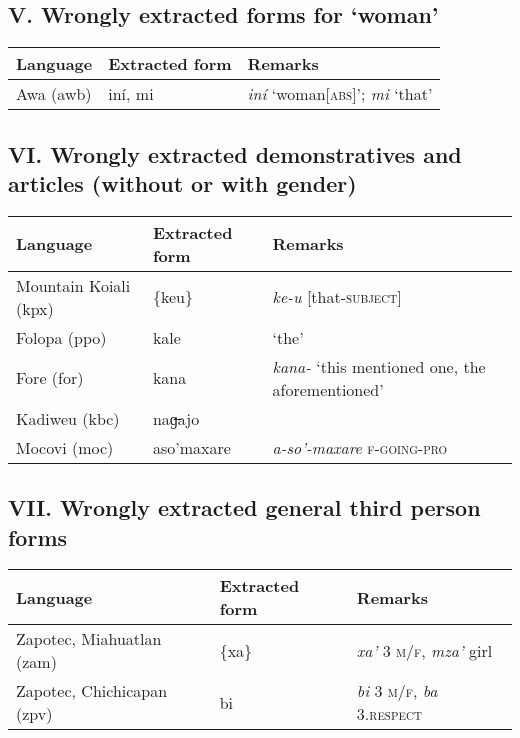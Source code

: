 \subsection*{V. Wrongly extracted forms for ‘woman’ \normalfont [1 language]}

{%
\setlength\tabcolsep{1.5pt}
\small
\begin{tabular}{L{.25\textwidth}L{.25\textwidth}L{.5\textwidth}}
\toprule
\bfseries Language & \bfseries Extracted form & \bfseries Remarks \\
\midrule
Awa (awb)	 & {iní, mi}	 & \textit{iní} ‘woman[\textsc{abs}]’; \textit{mi} ‘that’\\
\bottomrule
\end{tabular}
}%


\subsection*{VI. Wrongly extracted demonstratives and articles (without or with gender)
\normalfont [5 languages]}

{%
\setlength\tabcolsep{1.5pt}
\small
\begin{tabular}{L{.25\textwidth}L{.25\textwidth}L{.5\textwidth}}
\toprule
\bfseries Language & \bfseries Extracted form & \bfseries Remarks \\
\midrule
Mountain Koiali (kpx)	&	\{keu\}	&	\textit{ke-u} [that-\textsc{subject}]	\\
Folopa (ppo)	&	kale	&	‘the’	\\
Fore (for)	&	kana	&	\textit{kana-} ‘this mentioned one, the aforementioned’	\\
Kadiweu (kbc)	&	naɡ̶ajo	&		\\
Mocovi (moc)	&	aso’maxare	&	\textit{a-so’-maxare} \textsc{f-going-pro}	\\
\bottomrule
\end{tabular}
}%


\subsection*{VII. Wrongly extracted general third person forms \normalfont [2 languages]}

{%
\setlength\tabcolsep{1.5pt}
\small
\begin{tabular}{L{.25\textwidth}L{.25\textwidth}L{.5\textwidth}}
\toprule
\bfseries Language & \bfseries Extracted form & \bfseries Remarks \\
\midrule
Zapotec, Miahuatlan (zam)	&	\{xa\textquotesingle{}\}	&	\textit{xa’} 3 \textsc{m/f}, \textit{mza’} girl	\\
Zapotec, Chichicapan (zpv)	&	bi	&	\textit{bi} 3 \textsc{m/f}, \textit{ba} 3.\textsc{respect}	\\
\bottomrule
\end{tabular}
}%


